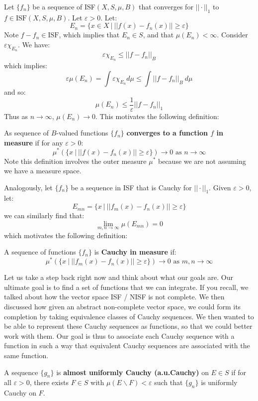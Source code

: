 \documentclass[a4paper,12pt]{report}
\newcommand{\varep}{ \varepsilon }
\newenvironment{definition}[1][Definition.]{\begin{trivlist}
\item[\hskip \labelsep {\bfseries #1}]}{\end{trivlist}}
\begin{document}
	\noindent Let $\{f_n\}$ be a sequence of ISF$(X, S, \mu, B)$ that converges for $||\cdot||_1$ to $f \in \text{ISF}(X, S, \mu, B)$. Let $\varep > 0$. Let:
	\[ E_n = \{x \in X ~|~ ||f(x) - f_n(x)|| \geq \varep \} \]
	Note $f - f_n \in \text{ISF}$, which implies that $E_n \in S$, and that $\mu(E_n) < \infty$. Consider $\varep \chi_{E_n}$. We have:
	\[ \varep \chi_{E_n} \leq ||f - f_n||_B \] 
	which implies:
	\[ \varep \mu(E_n) = \int \varep \chi_{E_n} d\mu \leq \int ||f - f_n||_B ~d\mu	\]
	and so:
	\[ \mu(E_n) \leq \frac{1}{\varep} ||f - f_n||_1 \]
	Thus as $n \rightarrow \infty$, $\mu(E_n) \rightarrow 0$. This motivates the following definition:
	
	\begin{definition}
	As sequence of $B$-valued functions $\{f_n\}$ \textbf{converges to a function $f$ in measure} if for any $\varep > 0$:
	\[ \mu^*(\{x ~|~ ||f(x) - f_n(x)|| \geq \varep \}) \rightarrow 0 \text{ as } n \rightarrow \infty \]
	Note this definition involves the outer measure $\mu^*$ because we are not assuming we have a measure space. 
	\end{definition}
	
	\noindent Analogously, let $\{f_n\}$ be a sequence in ISF that is Cauchy for $||\cdot||_1$. Given $\varep > 0$, let:
	\[ E_{mn} = \{ x ~|~ ||f_m(x) - f_n(x)|| \geq \varep \} \]
	we can similarly find that:
	\[ \lim_{m,n \rightarrow \infty} \mu(E_{mn}) = 0 \]
	which motivates the following definition:
	
	\begin{definition}
	A sequence of functions $\{f_n\}$ is \textbf{Cauchy in measure} if:
	\[ \mu^*(\{x ~|~ ||f_m(x) - f_n(x)|| \geq \varep \}) \rightarrow 0 \text{ as } m, n \rightarrow \infty \]
	\end{definition}
		
	\noindent Let us take a step back right now and think about what our goals are. Our ultimate goal is to find a set of functions that we can integrate. If you recall, we talked about how the vector space ISF / NISF is not complete. We then discussed how given an abstract non-complete vector space, we could form its completion by taking equivalence classes of Cauchy sequences. We then wanted to be able to represent these Cauchy sequences as functions, so that we could better work with them. Our goal is thus to associate each Cauchy sequence with a function in such a way that equivalent Cauchy sequences are associated with the same function. 
	
	\begin{definition}
	A sequence $\{g_n\}$ is \textbf{almost uniformly Cauchy (a.u.Cauchy)} on $E \in S$ if for all $\varep > 0$, there exists $F \in S$ with $\mu(E \backslash F) < \varep$ such that $\{g_n\}$ is uniformly Cauchy on $F$.
	\end{definition}
	
\end{document}
